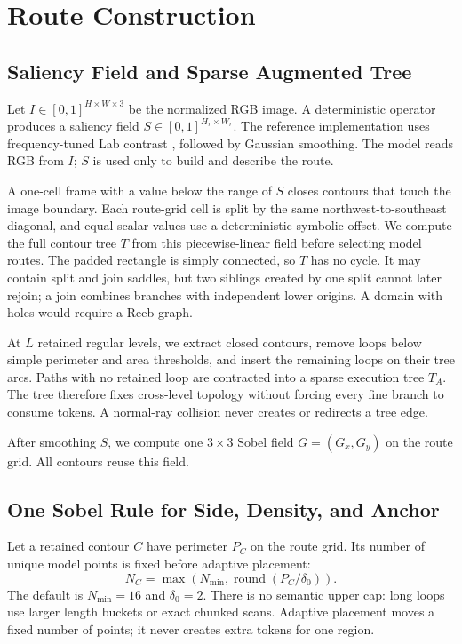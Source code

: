\section{Route Construction}
\label{sec:route}

\subsection{Saliency Field and Sparse Augmented Tree}

Let $I\in[0,1]^{H\times W\times3}$ be the normalized RGB image. A deterministic operator produces a saliency field $S\in[0,1]^{H_r\times W_r}$. The reference implementation uses frequency-tuned Lab contrast \cite{achanta2009frequency}, followed by Gaussian smoothing. The model reads RGB from $I$; $S$ is used only to build and describe the route.

A one-cell frame with a value below the range of $S$ closes contours that touch the image boundary. Each route-grid cell is split by the same northwest-to-southeast diagonal, and equal scalar values use a deterministic symbolic offset. We compute the full contour tree $T$ from this piecewise-linear field before selecting model routes. The padded rectangle is simply connected, so $T$ has no cycle. It may contain split and join saddles, but two siblings created by one split cannot later rejoin; a join combines branches with independent lower origins. A domain with holes would require a Reeb graph.

At $L$ retained regular levels, we extract closed contours, remove loops below simple perimeter and area thresholds, and insert the remaining loops on their tree arcs. Paths with no retained loop are contracted into a sparse execution tree $T_A$. The tree therefore fixes cross-level topology without forcing every fine branch to consume tokens. A normal-ray collision never creates or redirects a tree edge.

After smoothing $S$, we compute one $3\times3$ Sobel field $G=(G_x,G_y)$ on the route grid. All contours reuse this field.

\subsection{One Sobel Rule for Side, Density, and Anchor}

Let a retained contour $C$ have perimeter $P_C$ on the route grid. Its number of unique model points is fixed before adaptive placement:
\begin{equation}
N_C=\max\!\left(N_{\min},\operatorname{round}(P_C/\delta_0)\right).
\label{eq:budget}
\end{equation}
The default is $N_{\min}=16$ and $\delta_0=2$. There is no semantic upper cap: long loops use larger length buckets or exact chunked scans. Adaptive placement moves a fixed number of points; it never creates extra tokens for one region.

